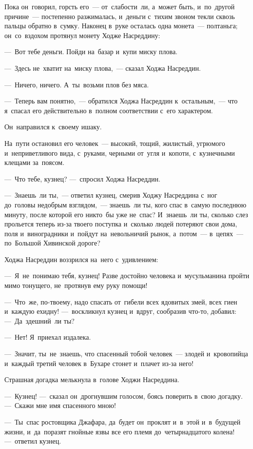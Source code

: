 \documentclass[12pt,a4paper]{book}
\begin{document}
Пока он~говорил, горсть его~— от~слабости~ли, а~может быть, и~по~другой причине~— постепенно разжималась, и~деньги с~тихим звоном текли сквозь пальцы обратно в~сумку. Наконец в~руке осталась одна монета~— полтаньга; он~со~вздохом протянул монету Ходже Насреддину:

—~Вот тебе деньги. Пойди на~базар и~купи миску плова.

—~Здесь не~хватит на~миску плова,~— сказал Ходжа Насреддин.

—~Ничего, ничего. А~ты~возьми плов без мяса.

—~Теперь вам понятно,~— обратился Ходжа Насреддин к~остальным,~— что я~спасал его действительно в~полном соответствии с~его характером.

Он~направился к~своему ишаку.

На~пути остановил его человек~— высокий, тощий, жилистый, угрюмого и~неприветливого вида, с~руками, черными от~угля и~копоти, с~кузнечными клещами за~поясом.

—~Что тебе, кузнец? —~спросил Ходжа Насреддин.

—~Знаешь~ли ты,~— ответил кузнец, смерив Ходжу Насреддина с~ног до~головы недобрым взглядом,~— знаешь~ли ты, кого спас в~самую последнюю минуту, после которой его никто~бы уже не~спас? И~знаешь~ли ты, сколько слез прольется теперь из-за твоего поступка и~сколько людей потеряют свои дома, поля и~виноградники и~пойдут на~невольничий рынок, а~потом~— в~цепях~— по~Большой Хивинской дороге?

Ходжа Насреддин воззрился на~него с~удивлением:

—~Я~не~понимаю тебя, кузнец! Разве достойно человека и~мусульманина пройти мимо тонущего, не~протянув ему руку помощи!

—~Что~же, по-твоему, надо спасать от~гибели всех ядовитых змей, всех гиен и~каждую ехидну! —~воскликнул кузнец и~вдруг, сообразив что-то, добавил: —~Да~здешний~ли ты?

—~Нет! Я~приехал издалека.

—~Значит, ты~не~знаешь, что спасенный тобой человек~— злодей и~кровопийца и~каждый третий человек в~Бухаре стонет и~плачет из-за него!

Страшная догадка мелькнула в~голове Ходжи Насреддина.

—~Кузнец! —~сказал он~дрогнувшим голосом, боясь поверить в~свою догадку. —~Скажи мне имя спасенного мною!

—~Ты~спас ростовщика Джафара, да~будет он~проклят и~в~этой и~в~будущей жизни, и~да~поразят гнойные язвы все его племя до~четырнадцатого колена! —~ответил кузнец.
\end{document}
